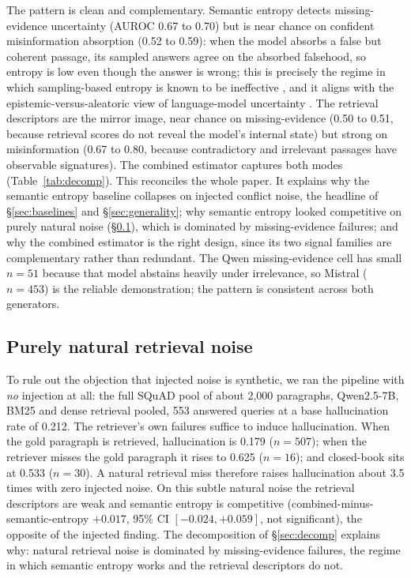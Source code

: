 \documentclass[sn-basic]{sn-jnl}
\theoremstyle{thmstyleone}
\theoremstyle{thmstyletwo}
\begin{document}
The pattern is clean and complementary. Semantic entropy detects
missing-evidence uncertainty (AUROC 0.67 to 0.70) but is near chance on
confident misinformation absorption (0.52 to 0.59): when the model
absorbs a false but coherent passage, its sampled answers agree on the
absorbed falsehood, so entropy is low even though the answer is wrong; this
is precisely the regime in which sampling-based entropy is known to be
ineffective \citep{ma2025semanticenergy}, and it aligns with the
epistemic-versus-aleatoric view of language-model uncertainty
\citep{ahdritz2024knowable}.
The retrieval descriptors are the mirror image, near chance on
missing-evidence (0.50 to 0.51, because retrieval scores do not reveal
the model's internal state) but strong on misinformation (0.67 to 0.80,
because contradictory and irrelevant passages have observable
signatures). The combined estimator captures both modes
(Table~\ref{tab:decomp}). This reconciles the whole paper. It explains
why the semantic entropy baseline collapses on injected conflict noise,
the headline of \S\ref{sec:baselines} and \S\ref{sec:generality}; why
semantic entropy looked competitive on purely natural noise
(\S\ref{sec:natnoise}), which is dominated by missing-evidence failures;
and why the combined estimator is the right design, since its two
signal families are complementary rather than redundant. The Qwen
missing-evidence cell has small $n = 51$ because that model abstains
heavily under irrelevance, so Mistral ($n = 453$) is the reliable
demonstration; the pattern is consistent across both generators.



\subsection{Purely natural retrieval noise}\label{sec:natnoise}
To rule out the objection that injected noise is synthetic, we ran the
pipeline with \emph{no} injection at all: the full SQuAD pool of about
2{,}000 paragraphs, Qwen2.5-7B, BM25 and dense retrieval pooled, 553
answered queries at a base hallucination rate of 0.212. The retriever's
own failures suffice to induce hallucination. When the gold paragraph is
retrieved, hallucination is 0.179 ($n = 507$); when the retriever misses
the gold paragraph it rises to 0.625 ($n = 16$); and closed-book sits at
0.533 ($n = 30$). A natural retrieval miss therefore raises hallucination
about 3.5 times with zero injected noise. On
this subtle natural noise the retrieval descriptors are weak and semantic
entropy is competitive (combined-minus-semantic-entropy $+0.017$, 95\% CI
$[-0.024, +0.059]$, not significant), the opposite of the injected
finding. The decomposition of \S\ref{sec:decomp} explains why: natural
retrieval noise is dominated by missing-evidence failures, the regime in
which semantic entropy works and the retrieval descriptors do not.
\end{document}
